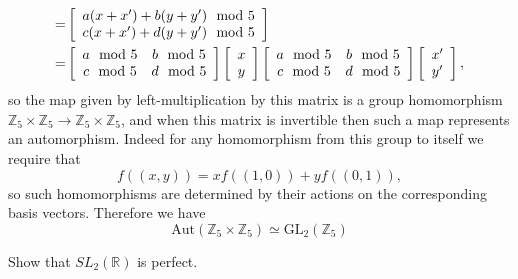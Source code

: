 \documentclass{article}
\newcounter{Problem}
\newenvironment{Problem}{\begin{Exercise}[name={Problem},
                                          counter={Problem}]}
                        {\end{Exercise}}
\begin{document}
\begin{Answer}
\begin{enumerate}
{\begin{align*}
        =&
        \left[\begin{array}{c}
          a(x + x^\prime) + b(y + y^\prime) \mod 5 \\
          c(x + x^\prime) + d(y + y^\prime) \mod 5
        \end{array}\right] \\
        =&
        \left[\begin{array}{c c}
          a \mod 5 & b \mod 5 \\
          c \mod 5 & d \mod 5
        \end{array}\right]
        \left[\begin{array}{c}
          x \\ y
        \end{array}\right]
        \left[\begin{array}{c c}
          a \mod 5 & b \mod 5 \\
          c \mod 5 & d \mod 5
        \end{array}\right]
        \left[\begin{array}{c}
          x^\prime \\ y^\prime
        \end{array}\right],
       \end{align*}
        so the map given by left-multiplication by this matrix is
        a group homomorphism
        $\mathbb{Z}_5 \times \mathbb{Z}_5 \to
         \mathbb{Z}_5 \times \mathbb{Z}_5$,
        and when this matrix is invertible then such a map represents an
        automorphism. Indeed for any homomorphism from this group to
        itself we require that
        $$
        f((x,y))
        = x f((1, 0)) + y f((0, 1)),
        $$
        so such homomorphisms are determined by their actions on the
        corresponding basis vectors.
        Therefore we have
        $$
        \mathrm{Aut}(\mathbb{Z}_5 \times \mathbb{Z}_5)
        \simeq \mathrm{GL}_2(\mathbb{Z}_5)
        $$
       }
\end{enumerate}

\end{Answer}

\pagebreak

\begin{Problem}
Show that $SL_2(\mathbb{R})$ is perfect.
\end{Problem}
\end{document}

